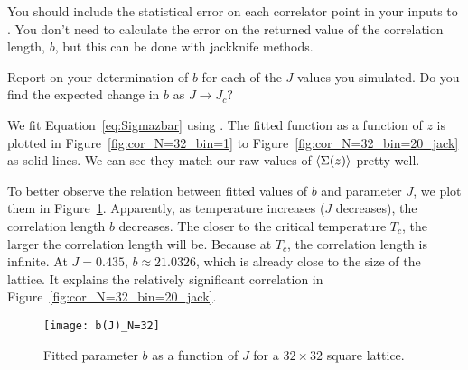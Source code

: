 You should include the statistical error on each correlator point in your inputs to
.
You don't need to calculate the error on the returned value of the correlation length,
\(b\), but this can be done with jackknife methods.

Report on your determination of \(b\) for each of the \(J\) values you
simulated. Do you find the expected change in \(b\) as \(J \rightarrow J_c\)?

\Answer{}
We fit Equation~\eqref{eq:Sigmazbar} using .
The fitted function as a function of \(z\) is plotted in Figure~\ref{fig:cor_N=32_bin=1}
to Figure~\ref{fig:cor_N=32_bin=20_jack} as solid lines.
We can see they match our raw values of \(\expval{\Sigma(z)}\) pretty well.

To better observe the relation between fitted values of \(b\) and parameter \(J\),
we plot them in Figure~\ref{fig:b_J_n=32}.
Apparently, as temperature increases (\(J\) decreases), the correlation length \(b\)
decreases. The closer to the critical temperature \(T_c\), the larger the correlation
length will be. Because at \(T_c\), the correlation length is infinite.
At \(J = 0.435\), \(b \approx 21.0326\), which is already close to the size of the lattice.
It explains the relatively significant correlation in Figure~\ref{fig:cor_N=32_bin=20_jack}.

\begin{figure}[hb]
    \centering
    \texttt{[image: b(J)\_N=32]}
    \caption{Fitted parameter \(b\) as a function of \(J\) for a \(32 \times 32\)
        square lattice.}
    \label{fig:b_J_n=32}
\end{figure}
